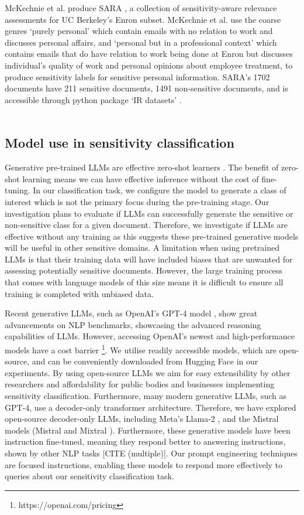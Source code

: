 McKechnie et al. produce SARA \cite{mckechnie2024sara}, a collection of sensitivity-aware relevance assessments for UC Berkeley’s Enron subset. McKechnie et al. use the coarse genres `purely personal' which contain emails with no relation to work and discusses personal affairs, and `personal but in a professional context' which contains emails that do have relation to work being done at Enron but discusses individual’s quality of work and personal opinions about employee treatment, to produce sensitivity labels for sensitive personal information. SARA’s 1702 documents have 211 sensitive documents, 1491 non-sensitive documents, and is accessible through python package `IR datasets' \cite{macavaney2021simplified}. \\\\

\subsection{Model use in sensitivity classification}
Generative pre-trained LLMs are effective zero-shot learners \cite{kojima2022large}. The benefit of zero-shot learning means we can have effective inference without the cost of fine-tuning. In our classification task, we configure the model to generate a class of interest which is not the primary focus during the pre-training stage. Our investigation plans to evaluate if LLMs can successfully generate the sensitive or non-sensitive class for a given document. Therefore, we investigate if LLMs are effective without any training as this suggests these pre-trained generative models will be useful in other sensitive domains. A limitation when using pretrained LLMs is that their training data will have included biases that are unwanted for assessing potentially sensitive documents. However, the large training process that comes with language models of this size means it is difficult to ensure all training is completed with unbiased data.

Recent generative LLMs, such as OpenAI’s GPT-4 model \cite{openai2023gpt}, show great advancements on NLP benchmarks, showcasing the advanced reasoning capabilities of LLMs. However, accessing OpenAI’s newest and high-performance models have a cost barrier \footnote{https://openai.com/pricing}. We utilise readily accessible models, which are open-source, and can be conveniently downloaded from Hugging Face \cite{wolf-etal-2020-transformers} in our experiments. By using open-source LLMs we aim for easy extensibility by other researchers and affordability for public bodies and businesses implementing sensitivity classification. Furthermore, many modern generative LLMs, such as GPT-4, use a decoder-only transformer architecture. Therefore, we have explored open-source decoder-only LLMs, including Meta’s Llama-2 \cite{touvron2023llama}, and the Mistral models (Mistral \cite{jiang2023mistral} and Mixtral \cite{jiang2024mixtral}). Furthermore, these generative models have been instruction fine-tuned, meaning they respond better to answering instructions, shown by other NLP tasks \cite{}[CITE (multiple)]. Our prompt engineering techniques are focused instructions, enabling these models to respond more effectively to queries about our sensitivity classification task.

